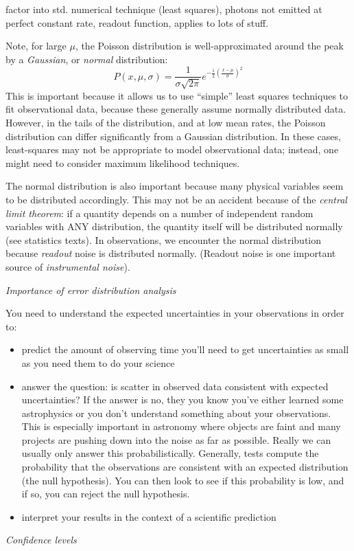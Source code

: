 \documentclass[12pt]{article}
\begin{document}
\textcolor{myBlue}{factor into std. numerical technique (least
squares), photons not emitted at perfect constant rate, readout
function, applies to lots of stuff}.

Note, for large $\mu$, the Poisson distribution is
well-approximated around the peak by a \emph{Gaussian}, or
\emph{normal} distribution:
    $$ P(x,\mu,\sigma) = \frac{1}{\sigma\sqrt{2\pi}}
        e^{ -\frac{1}{2} (\frac{x-\mu}{\sigma})^2 }  $$
This is important because it allows us to use ``simple'' least squares
techniques to fit observational data, because these generally assume
normally distributed data. However, in the tails of the
distribution, and at low mean rates, the Poisson distribution can
differ significantly from a Gaussian distribution. In these cases,
least-squares may not be appropriate to model observational data;
instead, one might need to consider maximum likelihood techniques.

The normal distribution is also important because many
physical variables seem to be distributed accordingly. This may not be
an accident because of the \emph{central limit theorem}: if a quantity
depends on a number of independent random variables with ANY
distribution, the quantity itself will be distributed normally (see
statistics texts). In observations, we encounter the normal
distribution because \emph{readout} noise is distributed normally.
(Readout noise is one important source of \emph{instrumental noise}).

\emph{Importance of error distribution analysis}

You need to understand the expected uncertainties in your
observations in order to:
\begin{itemize}
    \item predict the amount of observing time you'll need to get
    uncertainties as small as you need them to do your science
    \item answer the question: is scatter in observed data consistent
    with expected uncertainties? If the answer is no, they you know
    you've either learned some astrophysics or you don't understand
    something about your observations. This is especially important in
    astronomy where objects are faint and many projects are pushing
    down into the noise as far as possible. Really we can usually only
    answer this probabilistically. Generally, tests compute the
    probability that the observations are consistent with an expected
    distribution (the null hypothesis). You can then look to see if
    this probability is low, and if so, you can reject the null
    hypothesis.
    \item interpret your results in the context of a scientific
    prediction
\end{itemize}
\emph{Confidence levels}
\end{document}
